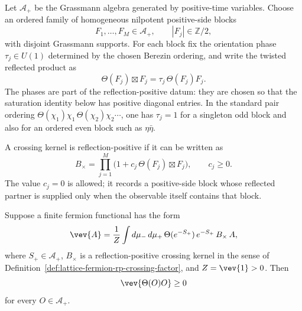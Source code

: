 \begin{definition}
\label{def:lattice-fermion-rp-crossing-factor}
Let \(\mathcal A_+\) be the Grassmann algebra generated by positive-time
variables.  Choose an ordered family of homogeneous nilpotent positive-side
blocks
\[
  F_1,\ldots,F_M\in\mathcal A_+,
  \qquad
  |F_j|\in\mathbb Z/2,
\]
with disjoint Grassmann supports.  For each block fix the orientation phase
\(\tau_j\in U(1)\) determined by the chosen Berezin ordering, and write the
twisted reflected product as
\[
  \Theta(F_j)\boxtimes F_j
  =
  \tau_j\,\Theta(F_j)F_j .
\]
The phases are part of the reflection-positive datum: they are chosen so that
the saturation identity below has positive diagonal entries.  In the standard
pair ordering
\(\Theta(\chi_1)\chi_1\,\Theta(\chi_2)\chi_2\cdots\), one has
\(\tau_j=1\) for a singleton odd block and also for an ordered even block such
as \(\eta\bar\eta\).

A crossing kernel is reflection-positive if it can be written as
\[
  B_\times
  =
  \prod_{j=1}^M\bigl(1+c_j\,\Theta(F_j)\boxtimes F_j\bigr),
  \qquad c_j\geq0 .
\]
The value \(c_j=0\) is allowed; it records a positive-side block whose
reflected partner is supplied only when the observable itself contains that
block.
\end{definition}

\begin{lemma}
\label{prop:lattice-fermion-finite-rp-criterion}
Suppose a finite fermion functional has the form
\[
  \vev{A}
  =
  \frac1Z
  \int d\mu_-\,d\mu_+\,
  \Theta(e^{-S_+})\,e^{-S_+}\,B_\times\,A ,
\]
where \(S_+\in\mathcal A_+\), \(B_\times\) is a reflection-positive crossing
kernel in the sense of Definition~\ref{def:lattice-fermion-rp-crossing-factor},
and \(Z=\vev{1}>0\).  Then
\[
  \vev{\Theta(O)O}\geq0
\]
for every \(O\in\mathcal A_+\).
\end{lemma}

